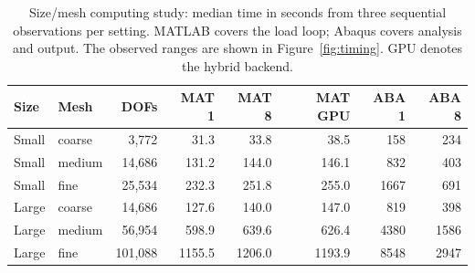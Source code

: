\begin{table}[htbp]
\centering\small
\caption{Size/mesh computing study: median time in seconds from three sequential observations per setting. MATLAB covers the load loop; Abaqus covers analysis and output. The observed ranges are shown in Figure~\ref{fig:timing}. GPU denotes the hybrid backend.}
\label{tab:scaling}
\begin{tabular}{llrrrrrr}
\hline
Size & Mesh & DOFs & MAT 1 & MAT 8 & MAT GPU & ABA 1 & ABA 8 \\
\hline
Small & coarse & 3,772 & 31.3 & 33.8 & 38.5 & 158 & 234 \\
Small & medium & 14,686 & 131.2 & 144.0 & 146.1 & 832 & 403 \\
Small & fine & 25,534 & 232.3 & 251.8 & 255.0 & 1667 & 691 \\
Large & coarse & 14,686 & 127.6 & 140.0 & 147.0 & 819 & 398 \\
Large & medium & 56,954 & 598.9 & 639.6 & 626.4 & 4380 & 1586 \\
Large & fine & 101,088 & 1155.5 & 1206.0 & 1193.9 & 8548 & 2947 \\
\hline
\end{tabular}
\end{table}
